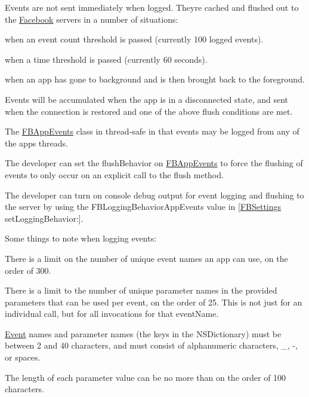 \begin{DoxyItemize}
\item Events are not sent immediately when logged. They\textquotesingle{}re cached and flushed out to the \hyperlink{interfaceFacebook}{Facebook} servers in a number of situations\+:
\begin{DoxyItemize}
\item when an event count threshold is passed (currently 100 logged events).
\item when a time threshold is passed (currently 60 seconds).
\item when an app has gone to background and is then brought back to the foreground.
\end{DoxyItemize}
\item Events will be accumulated when the app is in a disconnected state, and sent when the connection is restored and one of the above \textquotesingle{}flush\textquotesingle{} conditions are met.
\item The {\ttfamily \hyperlink{interfaceFBAppEvents}{F\+B\+App\+Events}} class in thread-\/safe in that events may be logged from any of the app\textquotesingle{}s threads.
\item The developer can set the {\ttfamily flush\+Behavior} on {\ttfamily \hyperlink{interfaceFBAppEvents}{F\+B\+App\+Events}} to force the flushing of events to only occur on an explicit call to the {\ttfamily flush} method.
\item The developer can turn on console debug output for event logging and flushing to the server by using the {\ttfamily F\+B\+Logging\+Behavior\+App\+Events} value in {\ttfamily \mbox{[}\hyperlink{interfaceFBSettings}{F\+B\+Settings} set\+Logging\+Behavior\+:\mbox{]}}.
\end{DoxyItemize}

Some things to note when logging events\+:


\begin{DoxyItemize}
\item There is a limit on the number of unique event names an app can use, on the order of 300.
\item There is a limit to the number of unique parameter names in the provided parameters that can be used per event, on the order of 25. This is not just for an individual call, but for all invocations for that event\+Name.
\item \hyperlink{classEvent}{Event} names and parameter names (the keys in the N\+S\+Dictionary) must be between 2 and 40 characters, and must consist of alphanumeric characters, \+\_\+, -\/, or spaces.
\item The length of each parameter value can be no more than on the order of 100 characters. 
\end{DoxyItemize}

